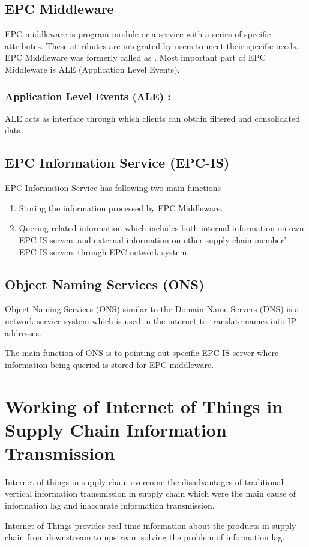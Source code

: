 \documentclass[12pt, a4paper]{report}
\begin{document}
\subsection{EPC Middleware}
EPC middleware is program module or a service with a series of specific attributes. These attributes are integrated by users to meet their specific needs. EPC Middleware was formerly called as . Most important part of EPC Middleware is ALE (Application Level Events).
\subsubsection{Application Level Events (ALE) :}
ALE acts as interface through which clients can obtain filtered and consolidated data.
\subsection{EPC Information Service (EPC-IS)}
EPC Information Service has following two main functions-
\begin{enumerate}
    \item Storing the information processed by EPC Middleware.
    \item Quering related information which includes both internal information on own EPC-IS servers and external information on other supply chain member' EPC-IS servers through EPC network system.
\end{enumerate}

\subsection{Object Naming Services (ONS)}
Object Naming Services (ONS) similar to the Domain Name Servers (DNS) is a network service system which is used in the internet to translate names into IP addresses. \par The main function of ONS is to pointing out specific EPC-IS server where information being queried is stored for EPC middleware.\cite{wiki}

\section{Working of Internet of Things in Supply Chain Information Transmission}
Internet of things in supply chain overcome the disadvantages of traditional vertical information transmission in supply chain which were the main cause of information lag and inaccurate information transmission.\par
Internet of Things provides real time information about the products in supply chain from downstream to upstream solving the problem of information lag. 
\end{document}
